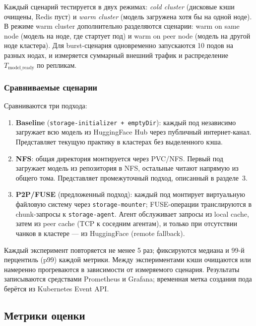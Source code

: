 Каждый сценарий тестируется в двух режимах: \textit{cold cluster} (дисковые кэши очищены, Redis пуст) и \textit{warm cluster} (модель загружена хотя бы на одной ноде). В режиме warm cluster дополнительно разделяются сценарии: warm on same node (модель на ноде, где стартует под) и warm on peer node (модель на другой ноде кластера). Для burst-сценария одновременно запускаются 10 подов на разных нодах, и измеряется суммарный внешний трафик и распределение $T_{\mathrm{model\_ready}}$ по репликам.

\subsubsection{Сравниваемые сценарии}

Сравниваются три подхода:

\begin{enumerate}[leftmargin=*]
  \item \textbf{Baseline} (\texttt{storage-initializer + emptyDir}): каждый под независимо загружает всю модель из HuggingFace Hub через публичный интернет-канал. Представляет текущую практику в кластерах без выделенного кэша.

  \item \textbf{NFS}: общая директория монтируется через PVC/NFS. Первый под загружает модель из репозитория в NFS, остальные читают напрямую из общего тома. Представляет промежуточный подход, описанный в разделе~3.

  \item \textbf{P2P/FUSE} (предложенный подход): каждый под монтирует виртуальную файловую систему через \texttt{storage-mounter}; FUSE-операции транслируются в chunk-запросы к \texttt{storage-agent}. Агент обслуживает запросы из local cache, затем из peer cache (TCP к соседним агентам), и только при отсутствии чанков в кластере --- из HuggingFace (remote fallback).
\end{enumerate}

Каждый эксперимент повторяется не менее 5 раз; фиксируются медиана и 99-й перцентиль (p99) каждой метрики. Между экспериментами кэши очищаются или намеренно прогреваются в зависимости от измеряемого сценария. Результаты записываются средствами Prometheus и Grafana; временная метка создания пода берётся из Kubernetes Event API.

\subsection{Метрики оценки}

